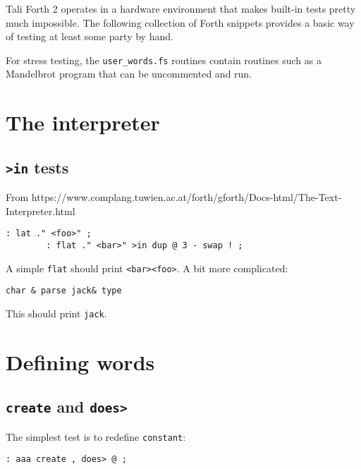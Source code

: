
Tali Forth 2 operates in a hardware environment that makes built-in
tests pretty much impossible. The following collection of
Forth snippets provides a basic way of testing at least some party by hand.

For stress testing, the \texttt{user\_words.fs} routines contain routines such as
a Mandelbrot program that can be uncommented and run.

\section{The interpreter}

\subsection{\texttt{>in} tests}

From
https://www.complang.tuwien.ac.at/forth/gforth/Docs-html/The-Text-Interpreter.html

\begin{lstlisting}[frame=lines]
        : lat ." <foo>" ;
        : flat ." <bar>" >in dup @ 3 - swap ! ; 
\end{lstlisting}

\noindent A simple \texttt{flat} should print \texttt{<bar><foo>}. A bit more complicated:

\begin{lstlisting}[frame=lines]
        char & parse jack& type
\end{lstlisting}

\noindent This should print \texttt{jack}.


\section{Defining words}

\subsection{\texttt{create} and \texttt{does>}}
The simplest test is to redefine \texttt{constant}:

\begin{lstlisting}[frame=lines]
        : aaa create , does> @ ; 
\end{lstlisting}


